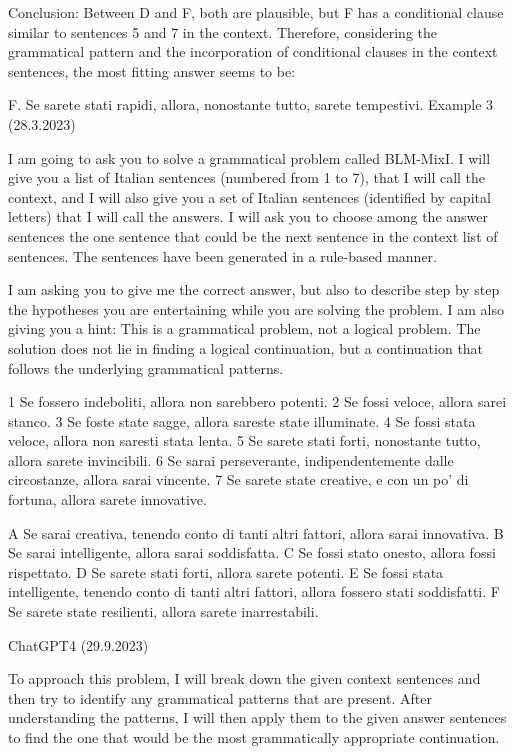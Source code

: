 Conclusion:
Between D and F, both are plausible, but F has a conditional clause similar to sentences 5 and 7 in the context. Therefore, considering the grammatical pattern and the incorporation of conditional clauses in the context sentences, the most fitting answer seems to be:

F. Se sarete stati rapidi, allora, nonostante tutto, sarete tempestivi.
Example 3 (28.3.2023)

I am going to ask you to solve a grammatical problem called BLM-MixI.  I will give you a list of Italian sentences (numbered from 1 to 7), that I will call the context, and I will also give you a set of Italian sentences (identified by capital letters) that I will call  the answers. I will ask you to choose among the answer sentences the one sentence that could be the next sentence in the context list of sentences. The sentences have been generated in a rule-based manner. 

I am asking you to give me the correct answer, but also to describe step by step  the hypotheses you are entertaining while you are solving the problem.
I am also giving you a hint: This is a grammatical problem, not a logical problem. The solution does not lie in finding a logical continuation, but a continuation that follows the underlying grammatical patterns.


1 Se fossero indeboliti, allora non sarebbero potenti.
2 Se fossi veloce, allora sarei stanco.
3 Se foste state sagge, allora sareste state illuminate.
4 Se fossi stata veloce, allora non saresti stata lenta.
5 Se sarete stati forti, nonostante tutto, allora sarete invincibili.
6 Se sarai perseverante, indipendentemente dalle circostanze, allora sarai vincente.
7 Se sarete state creative, e con un po' di fortuna, allora sarete innovative.

A Se sarai creativa, tenendo conto di tanti altri fattori, allora sarai innovativa.
B Se sarai intelligente, allora sarai soddisfatta.
C Se fossi stato onesto, allora fossi rispettato.
D Se sarete stati forti, allora sarete potenti.
E Se fossi stata intelligente, tenendo conto di tanti altri fattori, allora fossero stati soddisfatti.
F Se sarete state resilienti, allora sarete inarrestabili.


ChatGPT4 (29.9.2023)


To approach this problem, I will break down the given context sentences and then try to identify any grammatical patterns that are present. After understanding the patterns, I will then apply them to the given answer sentences to find the one that would be the most grammatically appropriate continuation.

